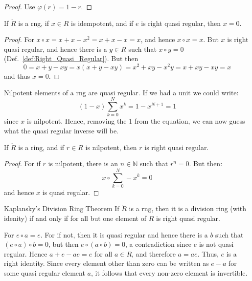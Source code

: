 \documentclass{book}                                                           %
\begin{document}
            \begin{proof}
                Use $\varphi(r)=1-r$.
            \end{proof}
            \begin{theorem}
                If $\ring{R}$ is a rng, if $x\in{R}$ is idempotent, and if
                $e$ is right quasi regular, then $x=0$.
            \end{theorem}
            \begin{proof}
                For $x\circ{x}=x+x-x^{2}=x+x-x=x$, and hence
                $x\circ{x}=x$. But $x$ is right quasi regular, and hence
                there is a $y\in{R}$ such that $x\circ{y}=0$
                (Def.~\ref{def:Right_Quasi_Regular}). But then
                \begin{equation}
                    0=x+y-xy=x(x+y-xy)=x^{2}+xy-x^{2}y=x+xy-xy=x
                \end{equation}
                and thus $x=0$.
            \end{proof}
            Nilpotent elements of a rng are quasi regular. If we had a unit
            we could write:
            \begin{equation}
                (1-x)\sum_{k=0}^{N}x^{k}=1-x^{N+1}=1
            \end{equation}
            since $x$ is nilpotent. Hence, removing the 1 from the equation,
            we can now guess what the quasi regular inverse will be.
            \begin{theorem}
                If $\ring{R}$ is a ring, and if $r\in{R}$ is nilpotent, then
                $r$ is right quasi regular.
            \end{theorem}
            \begin{proof}
                For if $r$ is nilpotent, there is an $n\in\mathbb{N}$ such
                that $r^{n}=0$. But then:
                \begin{equation}
                    x\circ\sum_{k=0}^{N}\minus{x}^{k}=0
                \end{equation}
                and hence $x$ is quasi regular.
            \end{proof}
            \begin{ftheorem}{Kaplansky's Division Ring Theorem}
                If $\ring{R}$ is a rng, then it is a division ring (with
                idenity) if and only if for all but one element of $R$ is
                right quasi regular.
            \end{ftheorem}
            \begin{bproof}
                For $e\circ{a}=e$. For if not, then it is quasi regular
                and hence there is a $b$ such that $(e\circ{a})\circ{b}=0$,
                but then $e\circ(a\circ{b})=0$, a contradiction since $e$ is
                not quasi regular. Hence $a+e-ae=e$ for all $a\in{R}$,
                and therefore $a=ae$. Thus, $e$ is a right identity. Since
                every element other than zero can be written as $e-a$ for
                some quasi regular element $a$, it follows that every
                non-zero element is invertible.
            \end{bproof}
\end{document}
